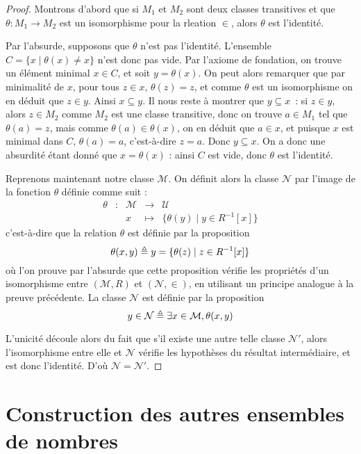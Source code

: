 \begin{proof}
  Montrons d'abord que si $M_1$ et $M_2$ sont deux classes transitives et que
  $\theta : M_1\to M_2$ est un isomorphisme pour la rleation $\in$, alors
  $\theta$ est l'identité.

  Par l'absurde, supposons que $\theta$ n'est pas l'identité. L'ensemble
  $C = \{x\mid \theta(x)\neq x\}$ n'est donc pas vide. Par l'axiome de
  fondation, on trouve un élément minimal $x\in C$, et soit $y = \theta(x)$. On
  peut alors remarquer que par minimalité de $x$, pour tous $z\in x$,
  $\theta(z)=z$, et comme $\theta$ est un isomorphisme on en déduit que
  $z\in y$. Ainsi $x\subseteq y$. Il nous reste à montrer que $y\subseteq x$~:
  si $z\in y$, alors $z\in M_2$ comme $M_2$ est une classe transitive, donc on
  trouve $a\in M_1$ tel que $\theta(a)=z$, mais comme $\theta(a)\in \theta(x)$,
  on en déduit que $a\in x$, et puisque $x$ est minimal dans $C$, $\theta(a)=a$,
  c'est-à-dire $z = a$. Donc $y\subseteq x$. On a donc une absurdité étant donné
  que $x = \theta(x)$ : ainsi $C$ est vide, donc $\theta$ est l'identité.

  Reprenons maintenant notre classe $\mathcal M$. On définit alors la classe
  $\mathcal N$ par l'image de la fonction $\theta$ définie comme suit :
  \[\begin{array}{rcccl}
  \theta & : & \mathcal M & \longrightarrow & \mathcal U\\
  & & x & \longmapsto & \{\theta(y)\mid y \in R^{-1}[x]\}
  \end{array}\]
  c'est-à-dire que la relation $\theta$ est définie par la proposition
  \[\theta(x,y) \triangleq y = \{\theta(z)\mid z \in R^{-1}[x]\}\]
  où l'on prouve par l'absurde que cette proposition vérifie les propriétés d'un
  isomorphisme entre $(\mathcal M,R)$ et $(\mathcal N,\in)$, en utilisant un
  principe analogue à la preuve précédente. La classe $\mathcal N$ est définie
  par la proposition
  \[y \in \mathcal N \triangleq \exists x\in\mathcal M, \theta(x,y)\]

  L'unicité découle alors du fait que s'il existe une autre telle classe
  $\mathcal N'$, alors l'isomorphisme entre elle et $\mathcal N$ vérifie les
  hypothèses du résultat intermédiaire, et est donc l'identité. D'où
  $\mathcal N = \mathcal N'$.
\end{proof}

\section{Construction des autres ensembles de nombres}

